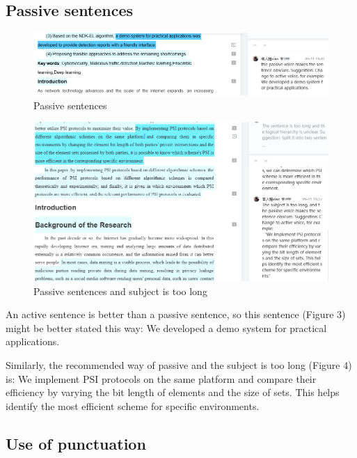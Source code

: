 \documentclass[sigconf]{acmart}
\begin{document}
\subsection{Passive sentences}

\begin{figure}[h]
  \centering
  \includegraphics[width=\linewidth]{./picture/passive_2.png}
  \caption{Passive sentences}
\end{figure}

\begin{figure}[h]
  \centering
  \includegraphics[width=\linewidth]{./picture/passive_1.png}
  \caption{Passive sentences and subject is too long}
\end{figure}

An active sentence is better than a passive sentence, so this sentence (Figure 3) might be better stated this way:
We developed a demo system for practical applications.

Similarly, the recommended way of passive and the subject is too long (Figure 4) is: 
We implement PSI protocols on the same platform and compare their efficiency by varying the bit 
length of elements and the size of sets. This helps identify the most efficient scheme for specific environments.

\subsection{Use of punctuation}
\end{document}
